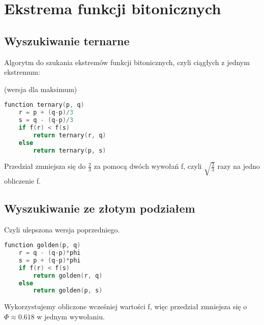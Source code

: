 \section{Ekstrema funkcji bitonicznych}

\subsection{Wyszukiwanie ternarne}
Algorytm do szukania ekstremów funkcji bitonicznych, czyli ciągłych z jednym ekstremum:

\noindent
(wersja dla maksimum)
\begin{lstlisting}[language=Cpp, morekeywords={ternary}]
function ternary(p, q)
    r = p + (q-p)/3
    s = q - (q-p)/3
    if f(r) < f(s)
        return ternary(r, q)
    else
        return ternary(p, s)
\end{lstlisting}
Przedział zmniejsza się do \( \frac{2}{3} \) za pomocą dwóch wywołań f, czyli \( \sqrt{\frac{2}{3}} \) razy na jedno obliczenie f.

\subsection{Wyszukiwanie ze złotym podziałem}
Czyli ulepszona wersja poprzedniego.
\begin{lstlisting}[language=Cpp, morekeywords={golden}]
function golden(p, q)
    r = q - (q-p)*phi
    s = p + (q-p)*phi
    if f(r) < f(s)
        return golden(r, q)
    else
        return golden(p, s)
\end{lstlisting}
Wykorzystujemy obliczone wcześniej wartości f, więc przedział zmniejsza się o \( \Phi \approx 0.618 \) \linebreak w jednym wywołaniu.